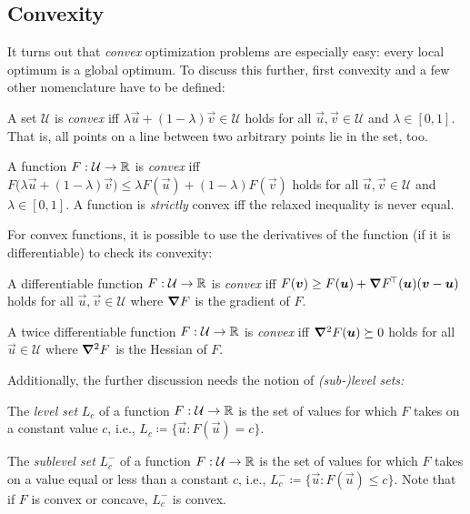 		\subsection{Convexity}
			It turns out that \emph{convex} optimization problems are especially easy: every local optimum is a global optimum. To discuss this further, first convexity and a few other nomenclature have to be defined:
			\begin{definition}
				A set \(\mathcal{U}\) is \emph{convex} iff \( \lambda \vec{u} + (1 - \lambda) \vec{v} \in \mathcal{U} \) holds for all \(\vec{u}, \vec{v} \in \mathcal{U}\) and \( \lambda \in [0, 1] \). That is, all points on a line between two arbitrary points lie in the set, too.
			\end{definition}
			\begin{definition}
				A function \( F : \mathcal{U} \to \mathbb{R} \) is \emph{convex} iff \( F\bigl( \lambda \vec{u} + (1 - \lambda) \vec{v} \bigr) \leq \lambda F(\vec{u}) + (1 - \lambda) F(\vec{v}) \) holds for all \( \vec{u}, \vec{v} \in \mathcal{U} \) and \( \lambda \in [0, 1] \). A function is \emph{strictly} convex iff the relaxed inequality is never equal.
			\end{definition}

			For convex functions, it is possible to use the derivatives of the function (if it is differentiable) to check its convexity:
			\begin{theorem}
				A differentiable function \( F : \mathcal{U} \to \mathbb{R} \) is \emph{convex} iff \( F(\bm{v}) \geq F(\bm{u}) + \grad{F}^{\!\top}(\bm{u}) (\bm{v} - \bm{u}) \) holds for all \( \vec{u}, \vec{v} \in \mathcal{U} \) where \( \grad{F} \) is the gradient of \(F\).
			\end{theorem}
			\begin{theorem}
				A twice differentiable function \( F : \mathcal{U} \to \mathbb{R} \) is \emph{convex} iff \( \grad^2 F(\bm{u}) \succeq 0 \) holds for all \( \vec{u} \in \mathcal{U} \) where \( \grad^2 F \) is the Hessian of \(F\).
			\end{theorem}

			Additionally, the further discussion needs the notion of \emph{(sub-)level sets:}
			\begin{definition}
				The \emph{level set} \(L_c\) of a function \( F : \mathcal{U} \to \mathbb{R} \) is the set of values for which \(F\) takes on a constant value \(c\), i.e., \( L_c \coloneqq \{ \vec{u} : F(\vec{u}) = c \} \).
			\end{definition}
			\begin{definition}
				The \emph{sublevel set} \(L_c^-\) of a function \( F : \mathcal{U} \to \mathbb{R} \) is the set of values for which \(F\) takes on a value equal or less than a constant \(c\), i.e., \( L_c^- \coloneqq \{ \vec{u} : F(\vec{u}) \leq c \} \). Note that if \(F\) is convex or concave, \(L_c^-\) is convex.
			\end{definition}

